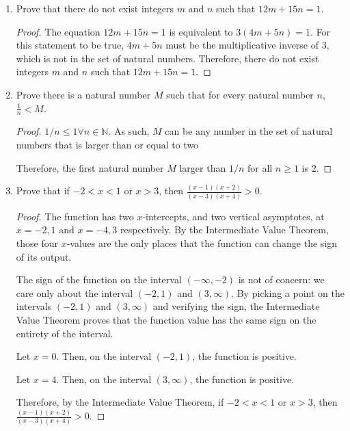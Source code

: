 \documentclass[10pt]{article}
\theoremstyle{definition}
\theoremstyle{plain}
\newcommand{\N}{\mathbb{N}}
\begin{document}
\begin{enumerate}
\item Prove that there do not exist integers $m$ and $n$ such that $12m + 15n = 1$.
  \begin{proof}
    The equation $12m + 15n = 1$ is equivalent to $3(4m+5n)=1$. For this statement to be true, $4m+5n$ must be the multiplicative inverse of $3$, which is not in the set of natural numbers. Therefore, there do not exist integers $m$ and $n$ such that $12m + 15n = 1$.
  \end{proof}

\item Prove there is a natural number $M$ such that for every natural number $n$, $\frac{1}{n} < M$.
  \begin{proof}
    $1/n \leq 1 \forall n\in\N$. As such, $M$ can be any number in the set of natural numbers that is larger than or equal to two

    \par Therefore, the first natural number $M$ larger than $1/n$ for all $n\geq 1$ is $2$.
  \end{proof}

\item Prove that if $-2 < x < 1$ or $x > 3$, then $\frac{(x-1)(x+2)}{(x-3)(x+4)} > 0$.
  \begin{proof}
    The function has two $x$-intercepts, and two vertical asymptotes, at $x=-2,1$ and $x=-4,3$ respectively. By the Intermediate Value Theorem, those four $x$-values are the only places that the function can change the sign of its output.

    \par The sign of the function on the interval $(-\infty, -2)$ is not of concern: we care only about the interval $(-2,1)$ and $(3,\infty)$. By picking a point on the intervals $(-2,1)$ and $(3,\infty)$ and verifying the sign, the Intermediate Value Theorem proves that the function value has the same sign on the entirety of the interval.

    \par Let $x=0$. Then, on the interval $(-2,1)$, the function is positive.

    \par Let $x=4$. Then, on the interval $(3,\infty)$, the function is positive.

    \par Therefore, by the Intermediate Value Theorem, if $-2 < x < 1$ or $x > 3$, then $\frac{(x-1)(x+2)}{(x-3)(x+4)} > 0$.
  \end{proof}
\end{enumerate} %
\end{document}
